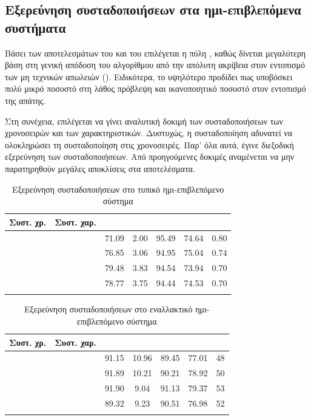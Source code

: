 \subsection{Εξερεύνηση συσταδοποιήσεων στα ημι-επιβλεπόμενα συστήματα}
Βάσει των αποτελεσμάτων του  και του  επιλέγεται η πύλη , καθώς δίνεται μεγαλύτερη βάση στη γενική απόδοση του αλγορίθμου από την απόλυτη ακρίβεια στον εντοπισμό των μη τεχνικών απωλειών (). Ειδικότερα, το υψηλότερο  προδίδει πως υποβόσκει πολύ μικρό ποσοστό στη λάθος πρόβλεψη και ικανοποιητικό ποσοστό στον εντοπισμό της απάτης.\par
Στη συνέχεια, επιλέγεται να γίνει αναλυτική δοκιμή των συσταδοποιήσεων των χρονοσειρών και των χαρακτηριστικών. Δυστυχώς, η συσταδοποίηση  αδυνατεί να ολοκληρώσει τη συσταδοποίηση στις χρονοσειρές. Παρ' όλα αυτά, έγινε διεξοδική εξερεύνηση των συσταδοποιήσεων. Από προηγούμενες δοκιμές αναμένεται να μην παρατηρηθούν μεγάλες αποκλίσεις στα αποτελέσματα.
\begin{center}
    \begin{longtabu} to 0.8\textwidth { | c | c || c | c | c | c | c |  }
 \hline
 Συστ. χρ.&Συστ. χαρ.&   &  &  &  & \\
\hline
{}& & 71.09 & 2.00 & 95.49 & 74.64 & 0.80\\
 \hline
 && 76.85 & 3.06 & 94.95 & 75.04 & 0.74\\ 
\hline
{}& &79.48& 3.83 & 94.54 & 73.94 & 0.70\\ 
 \hline
 & & 78.77 & 3.75 & 94.44 & 74.53 & 0.70\\
\hline
\caption{Εξερεύνηση συσταδοποιήσεων στο τυπικό ημι-επιβλεπόμενο σύστημα}
\label{tab:testclustersemisup1}
\end{longtabu}
\end{center}

\begin{center}
\begin{longtabu} to 0.8\textwidth { | c | c || c | c | c | c | c |   }
 \hline
 Συστ. χρ.& Συστ. χαρ.&   &  &  &  & \\
\hline
{} && 91.15 & 10.96  & 89.45 & 77.01 & 48\\
 \hline
 &&  91.89 & 10.21  & 90.21 & 78.92 & 50\\ 
\hline
{}& &91.90 & 9.04  & 91.13 & 79.37 & 53\\ 
 \hline
 & & 89.32 & 9.23  & 90.51 & 76.98 & 52\\
\hline
\caption{Εξερεύνηση συσταδοποιήσεων στο εναλλακτικό ημι-επιβλεπόμενο σύστημα}
\label{tab:testclustersemisup2}
\end{longtabu}
\end{center}
